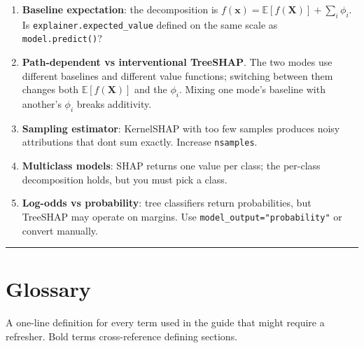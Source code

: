 \documentclass{article}
\providecommand{\tightlist}{\setlength{\itemsep}{0pt}\setlength{\parskip}{0pt}}
\let\oldsection\section
\renewcommand{\section}{\clearpage\oldsection}
\begin{document}
\begin{enumerate}
\def\labelenumi{\arabic{enumi}.}
\tightlist
\item
  \textbf{Baseline expectation}: the decomposition is
  \(f(\mathbf{x}) = \mathbb{E}[f(\mathbf{X})] + \sum_i \phi_i\). Is
  \texttt{explainer.expected\_value} defined on the same scale as
  \texttt{model.predict()}?
\item
  \textbf{Path-dependent vs interventional TreeSHAP}. The two modes
  use different baselines and different value functions; switching
  between them changes both \(\mathbb{E}[f(\mathbf{X})]\) and the
  \(\phi_i\). Mixing one mode's baseline with another's
  \(\phi_i\) breaks additivity.
\item
  \textbf{Sampling estimator}: KernelSHAP with too few samples produces
  noisy attributions that don\textquotesingle t sum exactly. Increase
  \texttt{nsamples}.
\item
  \textbf{Multiclass models}: SHAP returns one value per class; the
  per-class decomposition holds, but you must pick a class.
\item
  \textbf{Log-odds vs probability}: tree classifiers return
  probabilities, but TreeSHAP may operate on margins. Use
  \texttt{model\_output="probability"} or convert manually.
\end{enumerate}

\begin{center}\rule{0.5\linewidth}{0.5pt}\end{center}

\section{Glossary}\label{glossary}

A one-line definition for every term used in the guide that might
require a refresher. Bold terms cross-reference defining sections.
\end{document}
